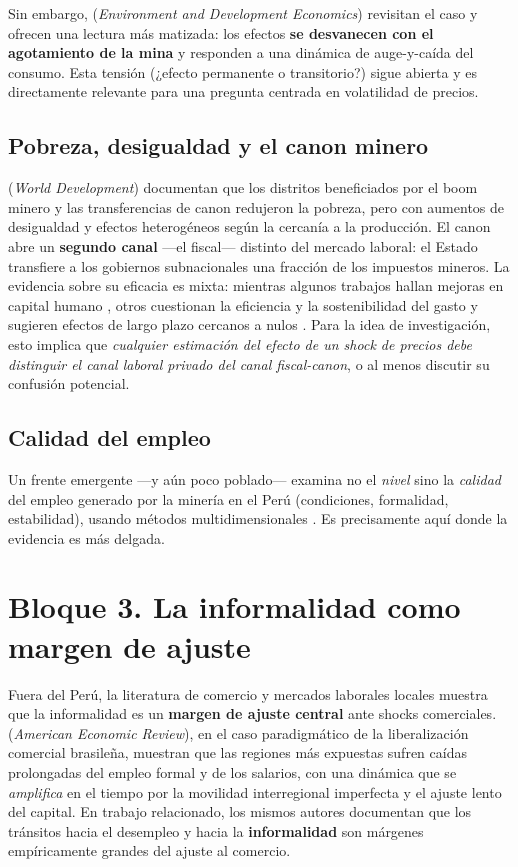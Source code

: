 \documentclass[11pt]{article}
\begin{document}
Sin embargo, \citet{aragon2020} (\textit{Environment and Development Economics}) revisitan el
caso y ofrecen una lectura más matizada: los efectos \textbf{se desvanecen con el agotamiento
de la mina} y responden a una dinámica de auge-y-caída del consumo. Esta tensión
(¿efecto permanente o transitorio?) sigue abierta y es directamente relevante para una
pregunta centrada en volatilidad de precios.

\subsection{Pobreza, desigualdad y el canon minero}
\citet{loayza2016} (\textit{World Development}) documentan que los distritos beneficiados por
el boom minero y las transferencias de canon redujeron la pobreza, pero con aumentos de
desigualdad y efectos heterogéneos según la cercanía a la producción. El canon abre un
\textbf{segundo canal} —el fiscal— distinto del mercado laboral: el Estado transfiere a los
gobiernos subnacionales una fracción de los impuestos mineros. La evidencia sobre su
eficacia es mixta: mientras algunos trabajos hallan mejoras en capital humano
\citep{aguero2017}, otros cuestionan la eficiencia y la sostenibilidad del gasto y sugieren
efectos de largo plazo cercanos a nulos \citep{aragon2023}. Para la idea de investigación,
esto implica que \emph{cualquier estimación del efecto de un shock de precios debe distinguir
el canal laboral privado del canal fiscal-canon}, o al menos discutir su confusión potencial.

\subsection{Calidad del empleo}
Un frente emergente —y aún poco poblado— examina no el \emph{nivel} sino la \emph{calidad}
del empleo generado por la minería en el Perú (condiciones, formalidad, estabilidad), usando
métodos multidimensionales \citep{jambrina2022}. Es precisamente aquí donde la evidencia es
más delgada.

\section{Bloque 3. La informalidad como margen de ajuste}

Fuera del Perú, la literatura de comercio y mercados laborales locales muestra que la
informalidad es un \textbf{margen de ajuste central} ante shocks comerciales.
\citet{dixcarneiro2017} (\textit{American Economic Review}), en el caso paradigmático de la
liberalización comercial brasileña, muestran que las regiones más expuestas sufren caídas
prolongadas del empleo formal y de los salarios, con una dinámica que se \emph{amplifica} en
el tiempo por la movilidad interregional imperfecta y el ajuste lento del capital. En trabajo
relacionado, los mismos autores documentan que los tránsitos hacia el desempleo y hacia la
\textbf{informalidad} son márgenes empíricamente grandes del ajuste al comercio.
\end{document}
